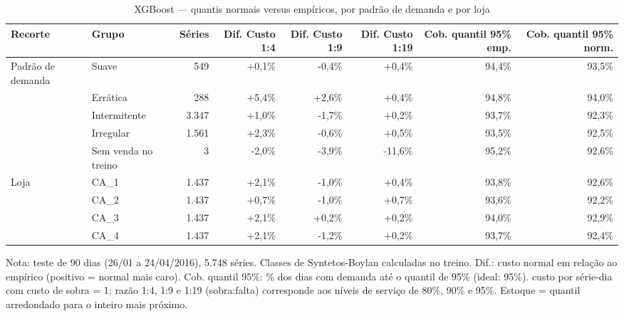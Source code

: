 \begin{table}[htbp]
\centering
\small
\caption{XGBoost — quantis normais versus empíricos, por padrão de demanda e por loja}
\label{tab:xgb_empirico_vs_normal_por_grupo}
\begin{tabular}{llrrrrrr}
\toprule
Recorte & Grupo & Séries & Dif. Custo 1:4 & Dif. Custo 1:9 & Dif. Custo 1:19 & Cob. quantil 95\% emp. & Cob. quantil 95\% norm. \\
\midrule
Padrão de demanda & Suave & 549 & +0,1\% & -0,4\% & +0,4\% & 94,4\% & 93,5\% \\
 & Errática & 288 & +5,4\% & +2,6\% & +0,4\% & 94,8\% & 94,0\% \\
 & Intermitente & 3.347 & +1,0\% & -1,7\% & +0,2\% & 93,7\% & 92,3\% \\
 & Irregular & 1.561 & +2,3\% & -0,6\% & +0,5\% & 93,5\% & 92,5\% \\
 & Sem venda no treino & 3 & -2,0\% & -3,9\% & -11,6\% & 95,2\% & 92,6\% \\
\addlinespace
Loja & CA\_1 & 1.437 & +2,1\% & -1,0\% & +0,4\% & 93,8\% & 92,6\% \\
 & CA\_2 & 1.437 & +0,7\% & -1,0\% & +0,7\% & 93,6\% & 92,2\% \\
 & CA\_3 & 1.437 & +2,1\% & +0,2\% & +0,2\% & 94,0\% & 92,9\% \\
 & CA\_4 & 1.437 & +2,1\% & -1,2\% & +0,2\% & 93,7\% & 92,4\% \\
\bottomrule
\end{tabular}
\par\smallskip
{\footnotesize Nota: teste de 90 dias (26/01 a 24/04/2016), 5.748 séries. Classes de Syntetos-Boylan calculadas no treino. Dif.: custo normal em relação ao empírico (positivo = normal mais caro). Cob. quantil 95\%: \% dos dias com demanda até o quantil de 95\% (ideal: 95\%). custo por série-dia com custo de sobra = 1; razão 1:4, 1:9 e 1:19 (sobra:falta) corresponde aos níveis de serviço de 80\%, 90\% e 95\%. Estoque = quantil arredondado para o inteiro mais próximo.}
\end{table}
